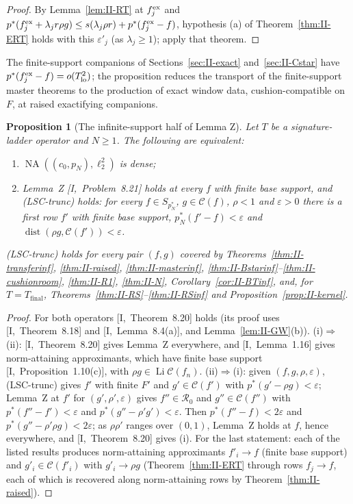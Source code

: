 \documentclass[10pt]{amsart}
\newtheorem{proposition}[theorem]{Proposition}
\theoremstyle{definition}
\theoremstyle{remark}
\newcommand{\NA}{\operatorname{NA}}
\newcommand{\dist}{\operatorname{dist}}
\newcommand{\Cset}{\mathcal C}
\newcommand{\Li}{\operatorname*{Li}}
\begin{document}
\begin{proof}
By Lemma~\ref{lem:II-RT} at $f^{\rm ex}_j$ and $p^*(f^{\rm ex}_j+\lambda_jr\rho
g)\le s(\lambda_j\rho r)+p^*(f^{\rm ex}_j-f)$, hypothesis (a) of
Theorem~\ref{thm:II-ERT} holds with this $\varepsilon'_j$ (as
$\lambda_j\ge1$); apply that theorem.
\end{proof}

The finite-support companions of Sections~\ref{sec:II-exact}
and~\ref{sec:II-Cstar} have $p^*(f^{\rm ex}_j-f)=o(T_{\rm lo}^2)$; the
proposition reduces the transport of the finite-support master theorems to
the production of exact window data, cushion-compatible on $F$, at raised
exactifying companions.

\begin{proposition}[The infinite-support half of Lemma Z]\label{prop:II-LSC}
Let $T$ be a signature-ladder operator and $N\ge1$.  The following are
equivalent:
\begin{enumerate}
\item[(i)] $\NA((c_0,p_N),\ell_2^2)$ is dense;
\item[(ii)] Lemma~Z [I,~Problem~8.21] holds at every $f$ with finite base
support, and \textup{(LSC-trunc)} holds: for every $f\in S_{p_N^*}$,
$g\in\Cset(f)$, $\rho<1$ and $\varepsilon>0$ there is a first row $f'$ with
finite base support, $p_N^*(f'-f)<\varepsilon$ and $\dist(\rho g,\Cset(f'))<
\varepsilon$.
\end{enumerate}
\textup{(LSC-trunc)} holds for every pair $(f,g)$ covered by
Theorems~\textup{\ref{thm:II-transferinf}}, \textup{\ref{thm:II-raised}},
\textup{\ref{thm:II-masterinf}}, \textup{\ref{thm:II-Bstarinf}}--\textup{\ref{thm:II-cushionroom}},
\textup{\ref{thm:II-R1}}, \textup{\ref{thm:II-N}}, Corollary~\textup{\ref{cor:II-BTinf}},
and, for $T=T_{\mathrm{final}}$, Theorems~\textup{\ref{thm:II-RS}}--\textup{\ref{thm:II-RSinf}}
and Proposition~\textup{\ref{prop:II-kernel}}.
\end{proposition}

\begin{proof}
For both operators [I,~Theorem~8.20] holds (its proof uses
[I,~Theorem~8.18] and [I,~Lemma~8.4(a)], and Lemma~\ref{lem:II-GW}(b)).
(i)$\Rightarrow$(ii): [I,~Theorem~8.20] gives Lemma~Z everywhere, and
[I,~Lemma~1.16] gives norm-attaining approximants, which have finite base
support [I,~Proposition~1.10(c)], with $\rho g\in\Li\Cset(f_n)$.
(ii)$\Rightarrow$(i): given $(f,g,\rho,\varepsilon)$, (LSC-trunc) gives $f'$ with
finite $F'$ and $g'\in\Cset(f')$ with $p^*(g'-\rho g)<\varepsilon$; Lemma~Z at
$f'$ for $(g',\rho',\varepsilon)$ gives $f''\in\mathcal R_0$ and $g''\in
\Cset(f'')$ with $p^*(f''-f')<\varepsilon$ and $p^*(g''-\rho'g')<\varepsilon$.
Then $p^*(f''-f)<2\varepsilon$ and $p^*(g''-\rho'\rho g)<2\varepsilon$; as
$\rho\rho'$ ranges over $(0,1)$, Lemma~Z holds at $f$, hence everywhere, and
[I,~Theorem~8.20] gives (i).  For the last statement: each of the listed
results produces norm-attaining approximants $f'_i\to f$ (finite base
support) and $g'_i\in\Cset(f'_i)$ with $g'_i\to\rho g$ (Theorem~\ref{thm:II-ERT}
through rows $f_j\to f$, each of which is recovered along norm-attaining
rows by Theorem~\ref{thm:II-raised}).
\end{proof}
\end{document}
